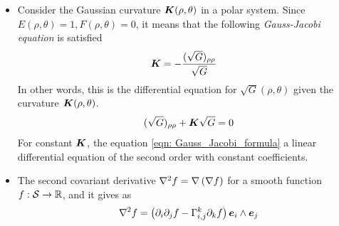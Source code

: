 \documentclass[11pt]{article}
\begin{document}
\begin{itemize}
\item  Consider the Gaussian curvature $\boldsymbol{K}(\rho,\theta)$ in a polar system. Since $E(\rho,\theta)=1,F(\rho, \theta)=0$, it means that the following \emph{Gauss-Jacobi equation} is satisfied
\begin{align}
\boldsymbol{K} &= -\frac{(\sqrt{G})_{\rho\rho}}{\sqrt{G}} \label{eqn: Gauss_Jacobi_formula}
\end{align}
In other words, this is the differential equation for $\sqrt{G}(\rho, \theta)$ given the curvature $\boldsymbol{K}(\rho, \theta)$.  
\begin{align}
(\sqrt{G})_{\rho\rho} + \boldsymbol{K}\sqrt{G} = 0 \label{eqn: Gauss_Jacobi_formula2}
\end{align}
 For constant $\boldsymbol{K}$, the equation \eqref{eqn: Gauss_Jacobi_formula} a linear differential equation of the second order with constant coefficients. 

\item The second covariant derivative $\nabla^{2} f = \nabla\left(\nabla f\right)$ for a smooth function $f: {\mathcal S} \rightarrow {\mathbb R}$, and it gives as
\begin{align}
\nabla^{2} f = \left(  \partial_{i}\partial_{j} f  - \Gamma_{i,j}^{k}\partial_{k} f \right) \boldsymbol{e}_{i}\wedge \boldsymbol{e}_{j}
\end{align}
\end{itemize}
\newpage
\end{document}
